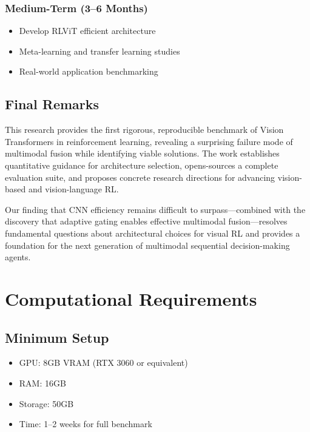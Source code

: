 \documentclass[12pt,a4paper,openany]{report}
\begin{document}
\subsection{Medium-Term (3--6 Months)}

\begin{itemize}
    \item Develop RLViT efficient architecture
    \item Meta-learning and transfer learning studies
    \item Real-world application benchmarking
\end{itemize}

\section{Final Remarks}

This research provides the first rigorous, reproducible benchmark of Vision Transformers in reinforcement learning, revealing a surprising failure mode of multimodal fusion while identifying viable solutions. The work establishes quantitative guidance for architecture selection, opens-sources a complete evaluation suite, and proposes concrete research directions for advancing vision-based and vision-language RL.

Our finding that CNN efficiency remains difficult to surpass---combined with the discovery that adaptive gating enables effective multimodal fusion---resolves fundamental questions about architectural choices for visual RL and provides a foundation for the next generation of multimodal sequential decision-making agents.


\appendix

\chapter{Computational Requirements}

\section{Minimum Setup}

\begin{itemize}
    \item GPU: 8GB VRAM (RTX 3060 or equivalent)
    \item RAM: 16GB
    \item Storage: 50GB
    \item Time: 1--2 weeks for full benchmark
\end{itemize}
\end{document}
